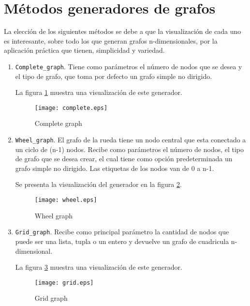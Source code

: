 \documentclass{article}
\begin{document}
\section*{Métodos generadores de grafos}
La elección de los siguientes métodos se debe a que la visualización de cada uno es interesante, sobre todo los que generan grafos n-dimensionales, por la aplicación práctica que tienen, simplicidad y variedad. 
\begin{enumerate}
\item \texttt{Complete\_graph}. Tiene como parámetros el número de nodos que se desea y el tipo de grafo, que toma por defecto un grafo simple no dirigido.  

La figura \ref{Figura1} muestra una visualización de este generador. 


\begin{figure}[H]
\centering
\texttt{[image: complete.eps]}  
\caption{Complete graph}
\label{Figura1}
\end{figure}

\item \texttt{Wheel\_graph}. El grafo de la rueda tiene un nodo central que esta conectado a un ciclo de (n-1) nodos. Recibe como parámetros el número de nodos, el tipo de grafo que se desea crear, el cual tiene como opción predeterminada un grafo simple no dirigido. Las etiquetas de los nodos van de 0 a n-1.

Se presenta la visualización del generador en la figura \ref{Figura2}.  


\begin{figure}[H]
\centering
\texttt{[image: wheel.eps]}  
\caption{Wheel graph}
\label{Figura2}
\end{figure}
 
\item \texttt{Grid\_graph}. Recibe como principal parámetro la cantidad de nodos que puede ser una lista, tupla o un entero y devuelve un grafo de cuadricula n-dimensional. 

La figura \ref{Figura3} muestra una visualización de este generador. 


\begin{figure}[H]
\centering
\texttt{[image: grid.eps]}  
\caption{Grid graph}
\label{Figura3}
\end{figure}


\end{enumerate}
\end{document}
